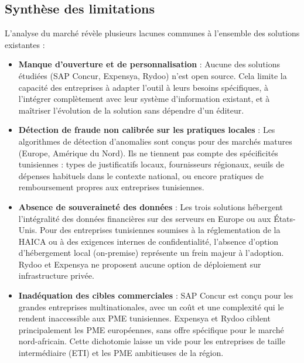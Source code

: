 \documentclass[12pt,a4paper]{report}
\begin{document}
\subsection{Synthèse des limitations}

L'analyse du marché révèle plusieurs lacunes communes à l'ensemble des solutions existantes :



\begin{itemize}

 \item \textbf{Manque d'ouverture et de personnalisation} : Aucune des solutions étudiées (SAP Concur, Expensya, Rydoo) n'est open source. Cela limite la capacité des entreprises à adapter l'outil à leurs besoins spécifiques, à l'intégrer complètement avec leur système d'information existant, et à maîtriser l'évolution de la solution sans dépendre d'un éditeur.



 \item \textbf{Détection de fraude non calibrée sur les pratiques locales} : Les algorithmes de détection d'anomalies sont conçus pour des marchés matures (Europe, Amérique du Nord). Ils ne tiennent pas compte des spécificités tunisiennes : types de justificatifs locaux, fournisseurs régionaux, seuils de dépenses habituels dans le contexte national, ou encore pratiques de remboursement propres aux entreprises tunisiennes.



 \item \textbf{Absence de souveraineté des données} : Les trois solutions hébergent l'intégralité des données financières sur des serveurs en Europe ou aux États-Unis. Pour des entreprises tunisiennes soumises à la réglementation de la HAICA ou à des exigences internes de confidentialité, l'absence d'option d'hébergement local (on-premise) représente un frein majeur à l'adoption. Rydoo et Expensya ne proposent aucune option de déploiement sur infrastructure privée.



 \item \textbf{Inadéquation des cibles commerciales} : SAP Concur est conçu pour les grandes entreprises multinationales, avec un coût et une complexité qui le rendent inaccessible aux PME tunisiennes. Expensya et Rydoo ciblent principalement les PME européennes, sans offre spécifique pour le marché nord-africain. Cette dichotomie laisse un vide pour les entreprises de taille intermédiaire (ETI) et les PME ambitieuses de la région.

\end{itemize}
\end{document}
